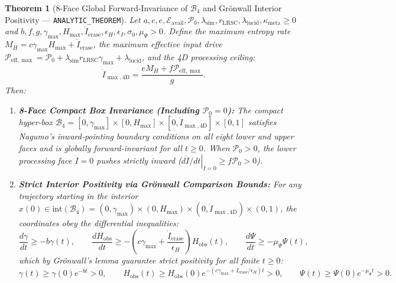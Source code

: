\documentclass[11pt,a4paper]{article}
\newtheorem{theorem}{Theorem}
\theoremstyle{definition}
\begin{document}
\begin{theorem}[8-Face Global Forward-Invariance of $\mathcal{B}_4$ and Gr\"onwall Interior Positivity --- \texttt{ANALYTIC\_THEOREM}]
\label{thm:existence_8face}
Let $a, c, e, \mathcal{E}_{\mathrm{avail}}, \mathcal{P}_0, \lambda_{\mathrm{sim}}, r_{\mathrm{LRSC}}, \lambda_{\mathrm{lucid}}, \kappa_{\mathrm{meta}} \ge 0$ and $b, f, g, \gamma_{\max}, H_{\max}, \dot{I}_{\mathrm{erase}}, \epsilon_H, \epsilon_I, \sigma_0, \mu_\Psi > 0$. Define the maximum entropy rate $M_H = c\gamma_{\max}H_{\max} + \dot{I}_{\mathrm{erase}}$, the maximum effective input drive $\mathcal{P}_{\mathrm{eff},\max} = \mathcal{P}_0 + \lambda_{\mathrm{sim}}r_{\mathrm{LRSC}}\gamma_{\max} + \lambda_{\mathrm{lucid}}$, and the 4D processing ceiling:
\begin{equation}
\label{eq:Imax4D}
\dot{I}_{\max,4\mathrm{D}} = \frac{e M_H + f\mathcal{P}_{\mathrm{eff},\max}}{g}.
\end{equation}
Then:
\begin{enumerate}
  \item \textbf{8-Face Compact Box Invariance (Including $\mathcal{P}_0 = 0$):} The compact hyper-box $\mathcal{B}_4 = [0, \gamma_{\max}] \times [0, H_{\max}] \times [0, \dot{I}_{\max,4\mathrm{D}}] \times [0, 1]$ satisfies Nagumo's inward-pointing boundary conditions on all eight lower and upper faces and is globally forward-invariant for all $t \ge 0$. When $\mathcal{P}_0 > 0$, the lower processing face $\dot{I} = 0$ pushes strictly inward ($\left.d\dot{I}/dt\right|_{\dot{I}=0} \ge f\mathcal{P}_0 > 0$).
  \item \textbf{Strict Interior Positivity via Gr\"onwall Comparison Bounds:} For any trajectory starting in the interior $x(0) \in \mathrm{int}(\mathcal{B}_4) = (0, \gamma_{\max}) \times (0, H_{\max}) \times (0, \dot{I}_{\max,4\mathrm{D}}) \times (0, 1)$, the coordinates obey the differential inequalities:
  \begin{equation}
  \label{eq:gronwall_bounds}
  \frac{d\gamma}{dt} \ge -b\gamma(t), \qquad \frac{dH_{\mathrm{obs}}}{dt} \ge -\left(c\gamma_{\max} + \frac{\dot{I}_{\mathrm{erase}}}{\epsilon_H}\right)H_{\mathrm{obs}}(t), \qquad \frac{d\Psi}{dt} \ge -\mu_\Psi\Psi(t),
  \end{equation}
  which by Gr\"onwall's lemma guarantee strict positivity for all finite $t \ge 0$:
  \begin{equation}
  \label{eq:exp_lower}
  \gamma(t) \ge \gamma(0)e^{-bt} > 0, \qquad H_{\mathrm{obs}}(t) \ge H_{\mathrm{obs}}(0)e^{-(c\gamma_{\max} + \dot{I}_{\mathrm{erase}}/\epsilon_H)t} > 0, \qquad \Psi(t) \ge \Psi(0)e^{-\mu_\Psi t} > 0.

\end{equation}
\end{enumerate}
\end{theorem}
\end{document}
